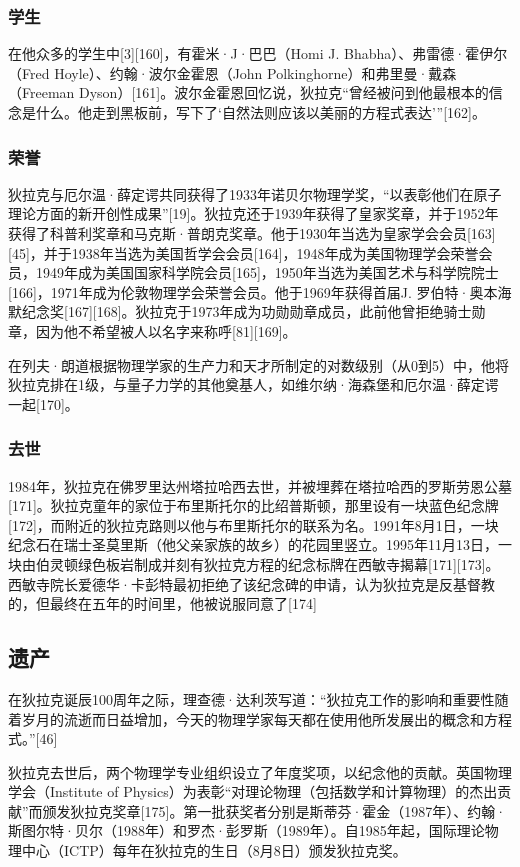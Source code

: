 \subsubsection{学生}  
在他众多的学生中[3][160]，有霍米·J·巴巴（Homi J. Bhabha）、弗雷德·霍伊尔（Fred Hoyle）、约翰·波尔金霍恩（John Polkinghorne）和弗里曼·戴森（Freeman Dyson）[161]。波尔金霍恩回忆说，狄拉克“曾经被问到他最根本的信念是什么。他走到黑板前，写下了‘自然法则应该以美丽的方程式表达’”[162]。
\subsubsection{荣誉}  
狄拉克与厄尔温·薛定谔共同获得了1933年诺贝尔物理学奖，“以表彰他们在原子理论方面的新开创性成果”[19]。狄拉克还于1939年获得了皇家奖章，并于1952年获得了科普利奖章和马克斯·普朗克奖章。他于1930年当选为皇家学会会员[163][45]，并于1938年当选为美国哲学会会员[164]，1948年成为美国物理学会荣誉会员，1949年成为美国国家科学院会员[165]，1950年当选为美国艺术与科学院院士[166]，1971年成为伦敦物理学会荣誉会员。他于1969年获得首届J. 罗伯特·奥本海默纪念奖[167][168]。狄拉克于1973年成为功勋勋章成员，此前他曾拒绝骑士勋章，因为他不希望被人以名字来称呼[81][169]。

在列夫·朗道根据物理学家的生产力和天才所制定的对数级别（从0到5）中，他将狄拉克排在1级，与量子力学的其他奠基人，如维尔纳·海森堡和厄尔温·薛定谔一起[170]。
\subsubsection{去世}
1984年，狄拉克在佛罗里达州塔拉哈西去世，并被埋葬在塔拉哈西的罗斯劳恩公墓[171]。狄拉克童年的家位于布里斯托尔的比绍普斯顿，那里设有一块蓝色纪念牌[172]，而附近的狄拉克路则以他与布里斯托尔的联系为名。1991年8月1日，一块纪念石在瑞士圣莫里斯（他父亲家族的故乡）的花园里竖立。1995年11月13日，一块由伯灵顿绿色板岩制成并刻有狄拉克方程的纪念标牌在西敏寺揭幕[171][173]。西敏寺院长爱德华·卡彭特最初拒绝了该纪念碑的申请，认为狄拉克是反基督教的，但最终在五年的时间里，他被说服同意了[174]
\subsection{遗产}
在狄拉克诞辰100周年之际，理查德·达利茨写道：“狄拉克工作的影响和重要性随着岁月的流逝而日益增加，今天的物理学家每天都在使用他所发展出的概念和方程式。”[46]

狄拉克去世后，两个物理学专业组织设立了年度奖项，以纪念他的贡献。英国物理学会（Institute of Physics）为表彰“对理论物理（包括数学和计算物理）的杰出贡献”而颁发狄拉克奖章[175]。第一批获奖者分别是斯蒂芬·霍金（1987年）、约翰·斯图尔特·贝尔（1988年）和罗杰·彭罗斯（1989年）。自1985年起，国际理论物理中心（ICTP）每年在狄拉克的生日（8月8日）颁发狄拉克奖。

